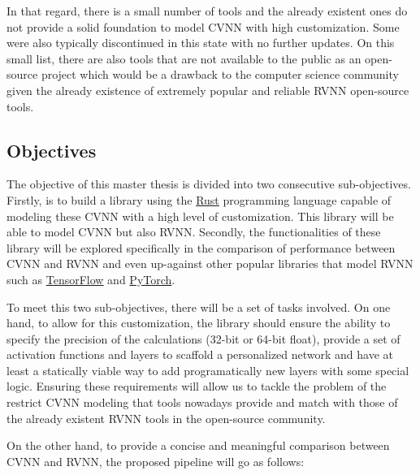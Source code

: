 In that regard, there is a small number of tools and the already existent ones do not provide a solid foundation to model \gls{CVNN} with high customization. Some were also typically discontinued in this state with no further updates. On this small list, there are also tools that are not available to the public as an open-source project which would be a drawback to the computer science community given the already existence of extremely popular and reliable \gls{RVNN} open-source tools.

\subsection{Objectives}

The objective of this master thesis is divided into two consecutive sub-objectives. Firstly, is to build a library using the \href{https://www.rust-lang.org/}{Rust} programming language capable of modeling these \gls{CVNN} with a high level of customization. This library will be able to model \gls{CVNN} but also \gls{RVNN}. Secondly, the functionalities of these library will be explored specifically in the comparison of performance between \gls{CVNN} and \gls{RVNN} and even up-against other popular libraries that model \gls{RVNN} such as \href{https://www.tensorflow.org/}{TensorFlow} and \href{https://pytorch.org/}{PyTorch}. 

To meet this two sub-objectives, there will be a set of tasks involved. On one hand, to allow for this customization, the library should ensure the ability to specify the precision of the calculations (32-bit or 64-bit float), provide a set of activation functions and layers to scaffold a personalized network and have at least a statically viable way to add programatically new layers with some special logic. Ensuring these requirements will allow us to tackle the problem of the restrict \gls{CVNN} modeling that tools nowadays provide and match with those of the already existent \gls{RVNN} tools in the open-source community.

On the other hand, to provide a concise and meaningful comparison between \gls{CVNN} and \gls{RVNN}, the proposed pipeline will go as follows:

